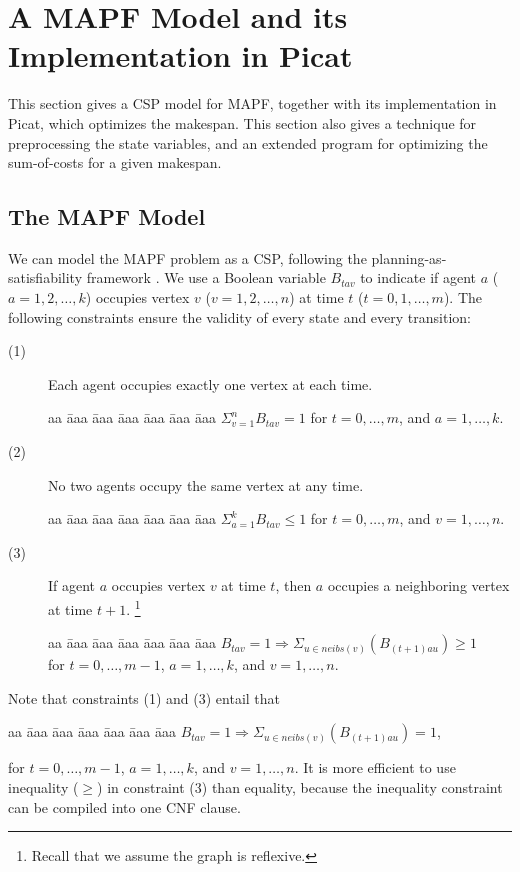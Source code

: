 \documentclass[conference]{IEEEtran}
\begin{document}
\section{A MAPF Model and its Implementation in Picat}
This section gives a CSP model for MAPF, together with its implementation in Picat, which optimizes the makespan. This section also gives a technique for preprocessing the state variables, and an extended program for optimizing the sum-of-costs for a given makespan.

\subsection{The MAPF Model}
We can model the MAPF problem as a CSP, following the planning-as-satisfiability framework \cite{KautzS92}. We use a Boolean variable $B_{t a v}$ to indicate if agent $a$ ($a = 1, 2, \ldots, k$) occupies vertex $v$ ($v = 1, 2, \ldots, n$) at time $t$ ($t = 0, 1,\ldots, m$). The following constraints ensure the validity of every state and every transition:
\begin{description}
\item[(1)] Each agent occupies exactly one vertex at each time.
\begin{tabbing}
aa \= aaa \= aaa \= aaa \= aaa \= aaa \= aaa \kill
$\Sigma_{v=1}^{n} B_{t a v} = 1$ for $t = 0, \ldots, m$, and $a = 1, \ldots, k$.  
\end{tabbing}

\item[(2)] No two agents occupy the same vertex at any time.
\begin{tabbing}
aa \= aaa \= aaa \= aaa \= aaa \= aaa \= aaa \kill
$\Sigma_{a=1}^{k} B_{t a v} \le 1$ for $t = 0, \ldots, m$, and $v = 1, \ldots, n$. 
\end{tabbing}

\item[(3)] If agent $a$ occupies vertex $v$ at time $t$, then $a$ occupies a neighboring vertex at time $t+1$. \footnote{Recall that we assume the graph is reflexive.}
\begin{tabbing}
aa \= aaa \= aaa \= aaa \= aaa \= aaa \= aaa \kill
$B_{t a v} = 1 \Rightarrow \Sigma_{u \in neibs(v)}(B_{(t+1) a u}) \ge 1$ \\
for $t = 0, \ldots, m-1$, $a = 1, \ldots, k$, and $v = 1, \ldots, n$.  \\ 
\end{tabbing}
\end{description}
Note that constraints (1) and (3) entail that
\begin{tabbing}
aa \= aaa \= aaa \= aaa \= aaa \= aaa \= aaa \kill
\> $B_{t a v} = 1 \Rightarrow \Sigma_{u \in neibs(v)}(B_{(t+1) a u}) = 1$,
\end{tabbing}
for $t = 0, \ldots, m-1$, $a = 1, \ldots, k$, and $v = 1, \ldots, n$.  It is more efficient to use inequality ($\ge$) in constraint (3) than equality, because the inequality constraint can be compiled into one CNF clause.
\end{document}
